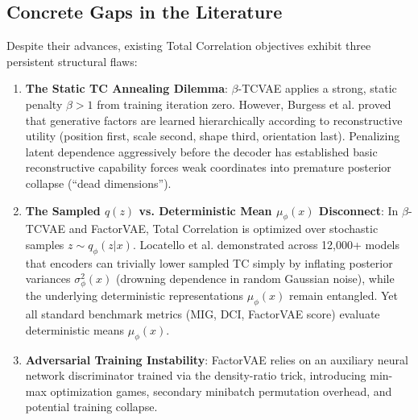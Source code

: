 \documentclass[10pt,journal,compsoc]{IEEEtran}
\begin{document}
\subsection{Concrete Gaps in the Literature}
Despite their advances, existing Total Correlation objectives exhibit three persistent structural flaws:
\begin{enumerate}
    \item \textbf{The Static TC Annealing Dilemma}: $\beta$-TCVAE applies a strong, static penalty $\beta > 1$ from training iteration zero. However, Burgess et al. \cite{burgess2018understanding} proved that generative factors are learned hierarchically according to reconstructive utility (position first, scale second, shape third, orientation last). Penalizing latent dependence aggressively before the decoder has established basic reconstructive capability forces weak coordinates into premature posterior collapse (``dead dimensions'').
    \item \textbf{The Sampled $q(z)$ vs. Deterministic Mean $\mu_\phi(x)$ Disconnect}: In $\beta$-TCVAE and FactorVAE, Total Correlation is optimized over stochastic samples $z \sim q_\phi(z|x)$. Locatello et al. \cite{locatello2019challenging} demonstrated across 12,000+ models that encoders can trivially lower sampled TC simply by inflating posterior variances $\sigma_\phi^2(x)$ (drowning dependence in random Gaussian noise), while the underlying deterministic representations $\mu_\phi(x)$ remain entangled. Yet all standard benchmark metrics (MIG, DCI, FactorVAE score) evaluate deterministic means $\mu_\phi(x)$.
    \item \textbf{Adversarial Training Instability}: FactorVAE relies on an auxiliary neural network discriminator trained via the density-ratio trick, introducing min-max optimization games, secondary minibatch permutation overhead, and potential training collapse.
\end{enumerate}
\end{document}
